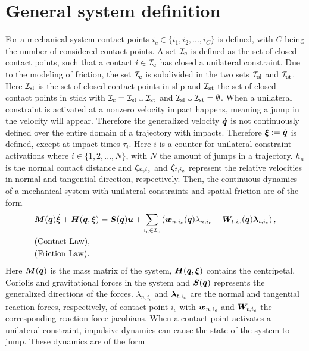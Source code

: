 \documentclass[../DC2017114Bouma.tex]{subfiles}
\begin{document}
\section{General system definition}
For a mechanical system contact points $i_c\in\{i_1,i_2,...,i_C\}$ is defined, with $C$ being the number of considered contact points. A set $\mathcal{I}_\text{c}$ is defined as the set of closed contact points, such that a contact $i\in\mathcal{I}_\text{c}$ has closed a unilateral constraint. Due to the modeling of friction, the set $\mathcal{I}_\text{c}$ is subdivided in the two sets $\mathcal{I}_{\text{sl}}$ and $\mathcal{I}_{\text{st}}$. Here $\mathcal{I}_{\text{sl}}$ is the set of closed contact points in slip and $\mathcal{I}_{\text{st}}$ the set of closed contact points in stick with $\mathcal{I}_\text{c} =\mathcal{I}_{\text{sl}}\cup\mathcal{I}_{\text{st}}$ and $\mathcal{I}_{\text{sl}}\cup\mathcal{I}_{\text{st}}=\emptyset$. When a unilateral constraint is activated at a nonzero velocity impact happens, meaning a jump in the velocity will appear. Therefore the generalized velocity $\dot{{\boldsymbol{q}}}$ is not continuously defined over the entire domain of a trajectory with impacts. Therefore $\boldsymbol{\xi}:=\dot{{\boldsymbol{q}}}$ is defined, except at impact-times $\tau_i$. Here $i$ is a counter for unilateral constraint activations where $i\in \{1,2,...,N\}$, with $N$ the amount of jumps in a trajectory. $h_n$ is the normal contact distance and $\boldsymbol{\zeta}_{n,i_c}$ and $\boldsymbol{\zeta}_{t,i_c}$ represent the relative velocities in normal and tangential direction,  respectively. Then, the continuous dynamics of a mechanical system with unilateral constraints and spatial friction are of the form
\begin{align}
&{\boldsymbol{M}}({\boldsymbol{q}})\dot{\boldsymbol{\xi}} + {\boldsymbol{H}}({\boldsymbol{q}},\boldsymbol{\xi}) = {\boldsymbol{S}}({\boldsymbol{q}}){\boldsymbol{u}} + \sum_{i_c\in\mathcal{I}_c}\left({\boldsymbol{w}}_{n,i_c}({\boldsymbol{q}})\lambda_{n,i_c} + {\boldsymbol{W}}_{t,i_c}({\boldsymbol{q}})\boldsymbol{\lambda}_{t,i_c} \right), \label{eq:appcont1}\\
&\text{(Contact Law)},\label{eq:appcont2}\\
&\text{(Friction Law)}.\label{eq:appcont3}
\end{align}
Here ${\boldsymbol{M}}({\boldsymbol{q}})$ is the mass matrix of the system, ${\boldsymbol{H}}({\boldsymbol{q}},\boldsymbol{\xi})$ contains the centripetal, Coriolis and gravitational forces in the system and ${\boldsymbol{S}}({\boldsymbol{q}})$ represents the generalized directions of the forces. $\lambda_{n,i_c}$ and $\boldsymbol{\lambda}_{t,i_c}$ are the normal and tangential reaction forces, respectively, of contact point $i_c$ with ${\boldsymbol{w}}_{n,i_c}$ and ${\boldsymbol{W}}_{t,i_c}$ the corresponding reaction force jacobians. When a contact point activates a unilateral constraint, impulsive dynamics can cause the state of the system to jump. These dynamics are of the form
\end{document}
